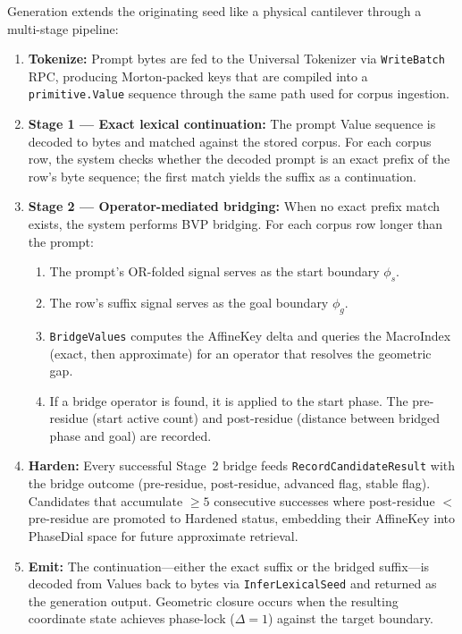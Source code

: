 Generation extends the originating seed like a physical cantilever through a multi-stage pipeline:

\begin{enumerate}[nosep]
  \item \textbf{Tokenize:} Prompt bytes are fed to the Universal Tokenizer via \texttt{WriteBatch} RPC, producing Morton-packed keys that are compiled into a \texttt{primitive.Value} sequence through the same path used for corpus ingestion.
  \item \textbf{Stage 1 --- Exact lexical continuation:} The prompt Value sequence is decoded to bytes and matched against the stored corpus. For each corpus row, the system checks whether the decoded prompt is an exact prefix of the row's byte sequence; the first match yields the suffix as a continuation.
  \item \textbf{Stage 2 --- Operator-mediated bridging:} When no exact prefix match exists, the system performs BVP bridging. For each corpus row longer than the prompt:
    \begin{enumerate}[nosep]
      \item The prompt's OR-folded signal serves as the start boundary $\phi_s$.
      \item The row's suffix signal serves as the goal boundary $\phi_g$.
      \item \texttt{BridgeValues} computes the AffineKey delta and queries the MacroIndex (exact, then approximate) for an operator that resolves the geometric gap.
      \item If a bridge operator is found, it is applied to the start phase. The pre-residue (start active count) and post-residue (distance between bridged phase and goal) are recorded.
    \end{enumerate}
  \item \textbf{Harden:} Every successful Stage~2 bridge feeds \texttt{RecordCandidateResult} with the bridge outcome (pre-residue, post-residue, advanced flag, stable flag). Candidates that accumulate $\ge 5$ consecutive successes where post-residue $<$ pre-residue are promoted to Hardened status, embedding their AffineKey into PhaseDial space for future approximate retrieval.
  \item \textbf{Emit:} The continuation---either the exact suffix or the bridged suffix---is decoded from Values back to bytes via \texttt{InferLexicalSeed} and returned as the generation output. Geometric closure occurs when the resulting coordinate state achieves phase-lock ($\Delta = 1$) against the target boundary.
\end{enumerate}
